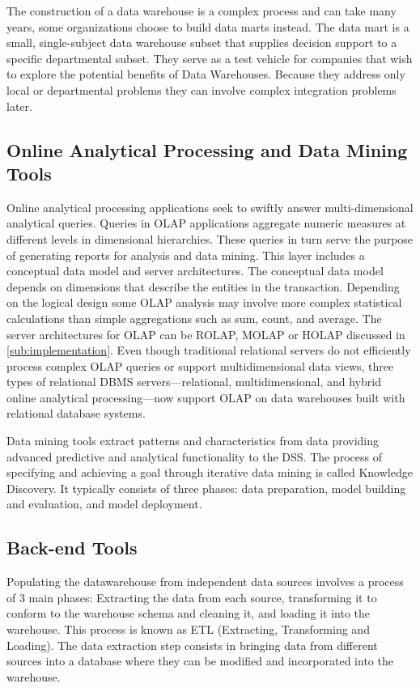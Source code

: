 \documentclass[]{article}
\begin{document}
The construction of a data warehouse is a complex process and can take many years, some organizations choose to build data
marts instead. The data mart is a small, single-subject data warehouse subset that supplies decision support to a specific
departmental subset. They serve as a test vehicle for companies that wish to explore the potential benefits of Data
Warehouses. Because they address only local or departmental problems they can involve complex integration problems later.


\subsection{Online Analytical Processing and Data Mining Tools} %
\label{sub:online_analytical_procesing_and_data_mining_tools}

Online analytical processing applications seek to swiftly answer multi-dimensional analytical queries. Queries in OLAP applications
aggregate numeric measures at different levels in dimensional hierarchies. These queries in turn serve the purpose of generating reports
for analysis and data mining. This layer includes a conceptual data model and server architectures. The conceptual data model depends on
dimensions that describe the entities in the transaction. Depending on the logical design some OLAP analysis may involve more complex
statistical calculations than simple aggregations such as sum, count, and average. The server architectures for OLAP can be ROLAP, MOLAP
or HOLAP discussed in \ref{sub:implementation}. Even though traditional relational servers do not efficiently process complex OLAP
queries or support multidimensional data views, three types of relational DBMS servers—relational, multidimensional, and hybrid online
analytical processing—now support OLAP on data warehouses built with relational database systems.

Data mining tools extract patterns and characteristics from data providing advanced predictive and analytical functionality to the DSS.
The process of specifying and achieving a goal through iterative data mining is called Knowledge Discovery. It typically consists of
three phases: data preparation, model building and evaluation, and model deployment.


\subsection{Back-end Tools} %
\label{sub:back_end_tools}
Populating the datawarehouse from independent data sources involves a process of 3 main phases: Extracting the data from each source,
transforming it to conform to the warehouse schema and cleaning it, and loading it into the warehouse. This process is known as ETL
(Extracting, Transforming and Loading).
The data extraction step consists in bringing data from different sources into a database where they can be modified and incorporated
into the warehouse.
\end{document}

